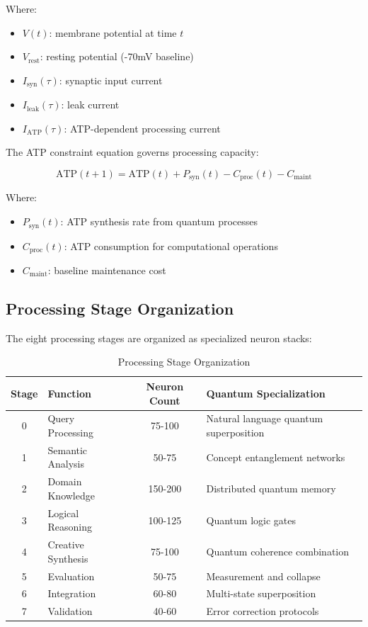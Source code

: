 \documentclass[11pt,a4paper]{article}
\begin{document}
Where:
\begin{itemize}
\item $V(t)$: membrane potential at time $t$
\item $V_{\text{rest}}$: resting potential (-70mV baseline)
\item $I_{\text{syn}}(\tau)$: synaptic input current
\item $I_{\text{leak}}(\tau)$: leak current
\item $I_{\text{ATP}}(\tau)$: ATP-dependent processing current
\end{itemize}

The ATP constraint equation governs processing capacity:

\begin{equation}
\text{ATP}(t+1) = \text{ATP}(t) + P_{\text{syn}}(t) - C_{\text{proc}}(t) - C_{\text{maint}}
\end{equation}

Where:
\begin{itemize}
\item $P_{\text{syn}}(t)$: ATP synthesis rate from quantum processes
\item $C_{\text{proc}}(t)$: ATP consumption for computational operations
\item $C_{\text{maint}}$: baseline maintenance cost
\end{itemize}

\subsection{Processing Stage Organization}

The eight processing stages are organized as specialized neuron stacks:

\begin{table}[H]
\centering
\begin{tabular}{|c|l|c|l|}
\hline
\textbf{Stage} & \textbf{Function} & \textbf{Neuron Count} & \textbf{Quantum Specialization} \\
\hline
0 & Query Processing & 75-100 & Natural language quantum superposition \\
\hline
1 & Semantic Analysis & 50-75 & Concept entanglement networks \\
\hline
2 & Domain Knowledge & 150-200 & Distributed quantum memory \\
\hline
3 & Logical Reasoning & 100-125 & Quantum logic gates \\
\hline
4 & Creative Synthesis & 75-100 & Quantum coherence combination \\
\hline
5 & Evaluation & 50-75 & Measurement and collapse \\
\hline
6 & Integration & 60-80 & Multi-state superposition \\
\hline
7 & Validation & 40-60 & Error correction protocols \\
\hline
\end{tabular}
\caption{Processing Stage Organization}
\end{table}
\end{document}
